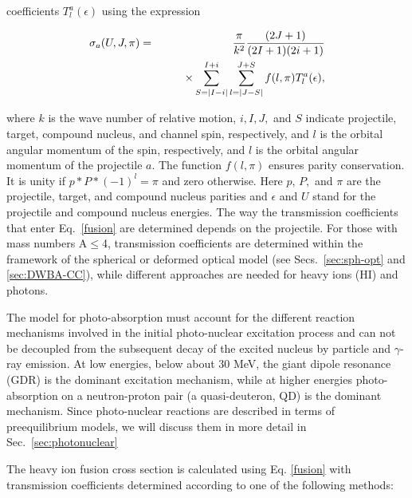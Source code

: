 coefficients $T_{l}^{a}(\epsilon)$ using the expression

\begin{eqnarray}
\sigma_{a}(U,J,\pi) & = &
\frac{\pi}{k^{2}}\frac{(2J+1)}{(2I+1)(2i+1)}  \label{fusion} \\
& & \qquad\times
\sum_{S=|I-i|}^{I+i}\sum_{l=|J-S|}^{J+S}f(l,\pi)T_{l}^{a}(\epsilon),  \notag
\end{eqnarray}

\noindent where $k$ is the wave number of relative motion, $i,I,J,$ and $S$
indicate projectile, target, compound nucleus, and channel spin,
respectively, and $l$ is the orbital angular momentum of the spin,
respectively, and $l$ is the orbital angular momentum of the projectile $a$.
The function $f(l,\pi)$ ensures parity conservation. It is unity if $%
p*P*(-1)^{l}=\pi$ and zero otherwise. Here $p,\, P,$ and $\pi$ are the
projectile, target, and compound nucleus parities and $\epsilon$ and $U$
stand for the projectile and compound nucleus energies. The way the
transmission coefficients that enter Eq.~\ref{fusion} are determined depends
on the projectile. For those with mass numbers A$\leq$4, transmission
coefficients are determined within the framework of the spherical or
deformed optical model (see Secs.~\ref{sec:sph-opt} and \ref{sec:DWBA-CC}),
while different approaches are needed for heavy ions (HI) and photons.

The model for photo-absorption must account for the different reaction
mechanisms involved in the initial photo-nuclear excitation process and can
not be decoupled from the subsequent decay of the excited nucleus by
particle and $\gamma$-ray emission. At low energies, below about 30 MeV, the
giant dipole resonance (GDR) is the dominant excitation mechanism, while at
higher energies photo-absorption on a neutron-proton pair (a quasi-deuteron,
QD) is the dominant mechanism. Since photo-nuclear reactions are described
in terms of preequilibrium models, we will discuss them in more detail in
Sec.~\ref{sec:photonuclear}

The heavy ion fusion cross section is calculated using Eq. \ref{fusion} with
transmission coefficients determined according to one of the following
methods:


